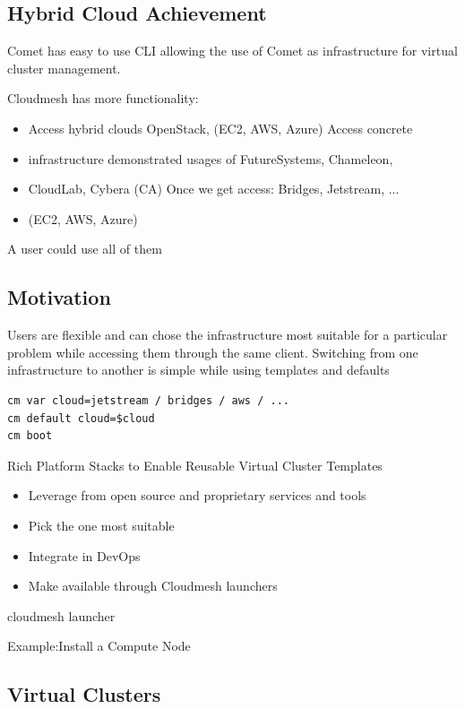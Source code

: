


\subsection{Hybrid Cloud Achievement}


Comet has easy to use CLI allowing the use of Comet as infrastructure for virtual cluster management.


Cloudmesh has more functionality:
\begin{itemize}
\item Access hybrid clouds OpenStack, (EC2, AWS, Azure) Access
  concrete
\item infrastructure demonstrated usages of FutureSystems, Chameleon,
\item CloudLab, Cybera (CA) Once we get access: Bridges, Jetstream, ...
\item (EC2, AWS, Azure)
\end{itemize}
A user could use all of them

\subsection{Motivation}

Users are flexible and can chose the infrastructure most suitable for a particular problem while accessing them through the same client.  Switching from one infrastructure to another is simple while using templates and defaults

\begin{verbatim}
cm var cloud=jetstream / bridges / aws / ...
cm default cloud=$cloud
cm boot
\end{verbatim}

Rich Platform Stacks to Enable Reusable Virtual Cluster Templates

\begin{itemize}
\item Leverage from open source and proprietary services and tools
\item Pick the one most suitable
\item Integrate in DevOps
\item Make available through Cloudmesh launchers
\end{itemize}
cloudmesh launcher

Example:Install a Compute Node


\subsection{Virtual Clusters}

